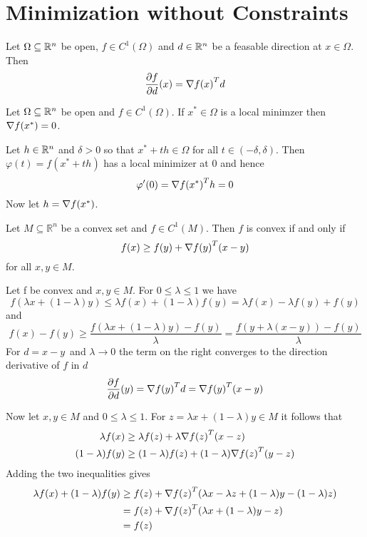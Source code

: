 
\newpage
\section{Minimization without Constraints}

\label{lemma:direction_derivative}
Let \( \Omega \subseteq \mathbb{R}^n \) be open, \( f \in C^1(\Omega) \) and \( d \in \mathbb{R}^n \) be a feasable direction 
at \( x \in \Omega \). Then
\[
    \frac{\partial f}{\partial d}(x) = \nabla{f(x)}^T d
\] 
\bigskip


\label{thm:fonc}
Let \( \Omega \subseteq \mathbb{R}^n \) be open and \( f \in C^1(\Omega) \). If \( x^* \in \Omega \) is a local minimzer then
\( \nabla f(x^*) = 0 \).

\proof{}
Let \( h \in \mathbb{R}^n \) and \( \delta > 0 \) so that \( x^* + th \in \Omega \) for all \( t \in (-\delta, \delta) \). 
Then \( \varphi(t) = f(x^* + th) \) has a local minimizer at \( 0 \) and hence
\[
    \varphi^\prime(0) = {\nabla f(x^*)}^T h = 0
\]
Now let \( h = \nabla f(x^*) \). 
\bigskip


\label{thm:lemma_gradient_inequality}
Let \(M \subseteq \mathbb{R}^n \) be a convex set and \(f \in C^1(M)\). Then \(f\) is convex if and only if
\[
    f(x) \ge f(y) + \nabla {f(y)}^T (x - y)
\]  
for all \(x, y \in M \). 

\proof{}
Let f be convex and \(x, y \in M\). For \( 0 \le \lambda \le 1 \) we have
\[ 
    f(\lambda x + (1 - \lambda) y) \le \lambda f(x) + (1 - \lambda)f(y) =  \lambda f(x) - \lambda f(y) + f(y) 
\] 
and 
\[ 
    f(x) - f(y) \ge \frac{f(\lambda x + (1 - \lambda) y) - f(y)}{\lambda}
        = \frac{f(y + \lambda (x - y)) - f(y)}{\lambda}
\]
For \( d = x - y \)\ and \( \lambda \to 0 \) the term on the right converges to the direction derivative of \( f \)
in \( d \)
\[
    \frac{\partial f}{\partial d}(y) = \nabla{f(y)}^T d = \nabla{f(y)}^T (x - y) 
\]

Now let \( x, y \in M \) and  \( 0 \le \lambda \le 1 \). For \( z = \lambda x + (1 - \lambda) y \in M \) it follows that
\[
    \begin{split}
        \lambda f(x) & \ge \lambda f(z) + \lambda \nabla {f(z)}^T (x - z) \\
            (1 - \lambda) f(y) & \ge (1 - \lambda) f(z) + (1 - \lambda) \nabla {f(z)}^T (y - z)
    \end{split}
\]
Adding the two inequalities gives
\[
    \begin{split}
       \lambda f(x) + (1 - \lambda) f(y) 
            & \ge f(z) + \nabla {f(z)}^T(\lambda x - \lambda z + (1- \lambda) y - (1-\lambda)z) \\
            & = f(z) + \nabla {f(z)}^T(\lambda x + (1- \lambda) y - z) \\
            & = f(z)
    \end{split}
\]
\bigskip


